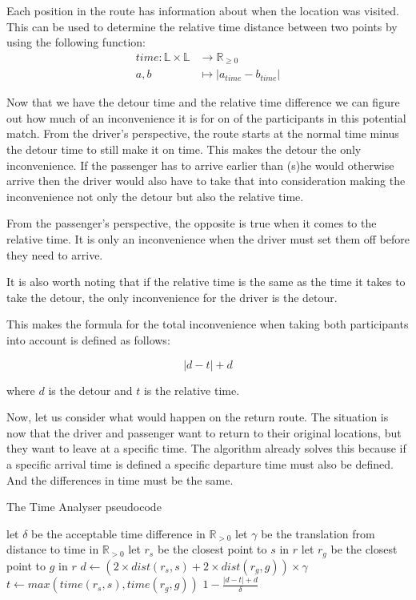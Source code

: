 Each position in the route has information about when the location was visited.
This can be used to determine the relative time distance between two points by using the following function:
\begin{align*}
	time : \mathbb{L}\times\mathbb{L} &\rightarrow \mathbb{R}_{\geq 0}\\
	a, b &\mapsto | a_{time} - b_{time} |
\end{align*}

Now that we have the detour time and the relative time difference we can figure out how much of an inconvenience it is for on of the participants in this potential match.
From the driver's perspective, the route starts at the normal time minus the detour time to still make it on time.
This makes the detour the only inconvenience.
If the passenger has to arrive earlier than (s)he would otherwise arrive then the driver would also have to take that into consideration making the inconvenience not only the detour but also the relative time.

From the passenger's perspective, the opposite is true when it comes to the relative time. 
It is only an inconvenience when the driver must set them off before they need to arrive.

It is also worth noting that if the relative time is the same as the time it takes to take the detour, the only inconvenience for the driver is the detour.

This makes the formula for the total inconvenience when taking both participants into account is defined as follows:

\[ |d - t| + d \]

where $d$ is the detour and $t$ is the relative time.

Now, let us consider what would happen on the return route.
The situation is now that the driver and passenger want to return to their original locations, but they want to leave at a specific time.
The algorithm already solves this because if a specific arrival time is defined a specific departure time must also be defined.
And the differences in time must be the same.

\begin{algorithm}
	\caption{The Time Analyser pseudocode}
	\label{alg:timeanalyser}
	\begin{algorithmic}[1]
		\Require 
		\Statex let $\delta$ be the acceptable time difference in $\mathbb{R}_{>0}$
		\Statex let $\gamma$ be the translation from distance to time in $\mathbb{R}_{>0}$ 
		\Statex 
			\State let $r_s$ be the closest point to $s$ in $r$
			\State let $r_g$ be the closest point to $g$ in $r$
			\State $d \gets (2\times dist(r_s,s) + 2\times dist(r_g,g))\times\gamma$
			\State $t \gets max(time(r_s, s), time(r_g, g))$
			\State\Return $1-\frac{|d - t| + d}{\delta}$
		\EndFunction
	\end{algorithmic}
\end{algorithm}

